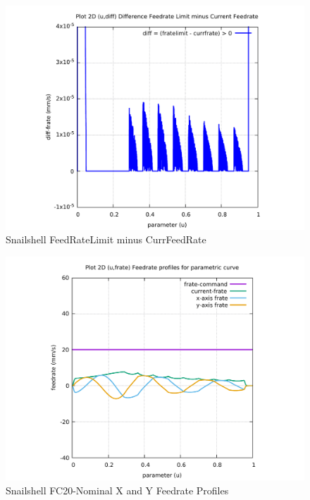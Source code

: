 \begin{figure}
	\caption     {Snailshell FeedRateLimit minus CurrFeedRate}
	\label{12-img-Snailshell-FeedRateLimit-minus-CurrFeedRate.pdf}
	\includegraphics[width=1.00\textwidth]{Chap4/appendix/app-Snailshell/plots/12-img-Snailshell-FeedRateLimit-minus-CurrFeedRate.pdf}
\end{figure}

\clearpage
\pagebreak

\begin{figure}
	\caption     {Snailshell FC20-Nominal X and Y Feedrate Profiles}
	\label{13-img-Snailshell-FC20-Nominal-X-and-Y-Feedrate-Profiles.pdf}
	\includegraphics[width=1.00\textwidth]{Chap4/appendix/app-Snailshell/plots/13-img-Snailshell-FC20-Nominal-X-and-Y-Feedrate-Profiles.pdf}
\end{figure}



